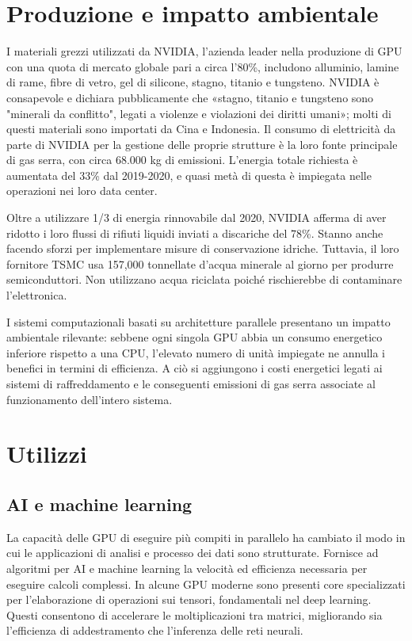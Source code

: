 \documentclass[12pt,a4paper,oneside]{book}
\begin{document}
\section{Produzione e impatto ambientale}

I materiali grezzi utilizzati da NVIDIA, l'azienda leader nella produzione di GPU con una quota di mercato globale pari a circa l'80\%, includono alluminio, lamine di rame, fibre di vetro, gel di silicone, stagno, titanio e tungsteno. NVIDIA è consapevole e dichiara pubblicamente che «stagno, titanio e tungsteno sono "minerali da conflitto"\citep[p.36]{nvidia2021report}, legati a violenze e violazioni dei diritti umani»; molti di questi materiali sono importati da Cina e Indonesia.
Il consumo di elettricità da parte di NVIDIA per la gestione delle proprie strutture è la loro fonte principale di gas serra, con circa 68.000 kg di emissioni. L'energia totale richiesta è aumentata del 33\% dal 2019-2020, e quasi metà di questa è impiegata nelle operazioni nei loro data center.

Oltre a utilizzare 1/3 di energia rinnovabile dal 2020, NVIDIA afferma di aver ridotto i loro flussi di rifiuti liquidi inviati a discariche del 78\%. Stanno anche facendo sforzi per implementare misure di conservazione idriche. Tuttavia, il loro fornitore TSMC usa 157,000 tonnellate d'acqua minerale al giorno per produrre semiconduttori. Non utilizzano acqua riciclata poiché rischierebbe di contaminare l'elettronica.

I sistemi computazionali basati su architetture parallele presentano un impatto ambientale rilevante: sebbene ogni singola GPU abbia un consumo energetico inferiore rispetto a una CPU, l'elevato numero di unità impiegate ne annulla i benefici in termini di efficienza. A ciò si aggiungono i costi energetici legati ai sistemi di raffreddamento e le conseguenti emissioni di gas serra associate al funzionamento dell'intero sistema.

\section{Utilizzi}

\subsection{AI e machine learning}

La capacità delle GPU di eseguire più compiti in parallelo ha cambiato il modo in cui le applicazioni di analisi e processo dei dati sono strutturate. Fornisce ad algoritmi per AI e machine learning la velocità ed efficienza necessaria per eseguire calcoli complessi.
In alcune GPU moderne sono presenti core specializzati per l'elaborazione di operazioni sui tensori, fondamentali nel deep learning. Questi consentono di accelerare le moltiplicazioni tra matrici, migliorando sia l'efficienza di addestramento che l'inferenza delle reti neurali.
\end{document}
